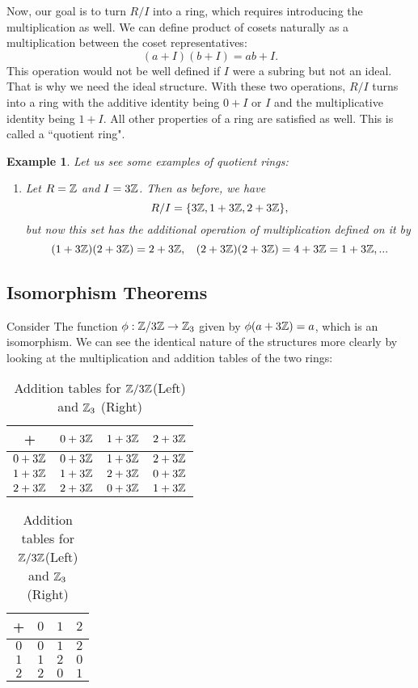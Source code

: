 \documentclass[12pt]{article}
\theoremstyle{plain}
\newtheorem{example}{Example}
\theoremstyle{definition}
\theoremstyle{remark}
\begin{document}
Now, our goal is to turn $R/I$ into a ring, which requires introducing the multiplication as well. We can define product of cosets naturally as a multiplication between the coset representatives:
\begin{equation}
    (a+I)(b+I)=ab+I.
\end{equation}
This operation would not be well defined if $I$ were a subring but not an ideal. That is why we need the ideal structure. With these two operations, $R/I$ turns into a ring with the additive identity being $0+I$ or $I$ and the multiplicative identity being $1+I$. All other properties of a ring are satisfied as well. This is called a ``quotient ring". 

\begin{example}
Let us see some examples of quotient rings:
\begin{enumerate}
    \item Let $R=\mathbb{Z}$ and $I=3\mathbb{Z}$. Then as before, we have 
    $$R/I = \{3\mathbb{Z}, 1+3\mathbb{Z}, 2+3\mathbb{Z}\},$$
    but now this set has the additional operation of multiplication defined on it by 
    $$(1+3\mathbb{Z})(2+3\mathbb{Z})=2+3\mathbb{Z}, \:\:\:\: (2+3\mathbb{Z})(2+3\mathbb{Z}) = 4+3\mathbb{Z}=1+3\mathbb{Z}, ...$$
\end{enumerate}
\end{example}

\subsection{Isomorphism Theorems}
Consider The function $\phi:\mathbb{Z}/3\mathbb{Z}\rightarrow \mathbb{Z}_3$ given by $\phi(a+3\mathbb{Z})=a$, which is an isomorphism. We can see the identical nature of the structures more clearly by looking at the multiplication and addition tables of the two rings:
\begin{table}[H]
\qquad \quad \quad \quad
\begin{tabular}{ c| c | c | c}
+ & $0+3\mathbb{Z}$ & $1+3\mathbb{Z}$ & $2+3\mathbb{Z}$ \\
\hline
$0+3\mathbb{Z}$ & $0+3\mathbb{Z}$ & $1+3\mathbb{Z}$ & $2+3\mathbb{Z}$  \\ 
\hline
$1+3\mathbb{Z}$ & $1+3\mathbb{Z}$ & $2+3\mathbb{Z}$ & $0+3\mathbb{Z}$  \\ 
\hline
$2+3\mathbb{Z}$ & $2+3\mathbb{Z}$ & $0+3\mathbb{Z}$ & $1+3\mathbb{Z}$ \\ 
\hline
\end{tabular}
\quad \quad \quad \quad \quad \quad \quad \quad \quad
\begin{tabular}{ c| c | c | c}
+ & $0$ & $1$ & $2$ \\
\hline
$0$ & $0$ & $1$ & $2$  \\ 
\hline
$1$ & $1$ & $2$ & $0$  \\ 
\hline
$2$ & $2$ & $0$ & $1$ \\ 
\hline
\end{tabular}

\caption{Addition tables for $\mathbb{Z}/3\mathbb{Z}$(Left) and $\mathbb{Z}_3$ (Right)}
\end{table}
\end{document}
